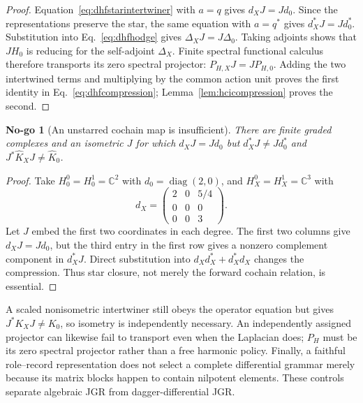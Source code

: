 \documentclass[11pt,a4paper]{article}
\newtheorem{nogo}[definition]{No-go}
\theoremstyle{remark}
\begin{document}
\begin{proof}
Equation~\eqref{eq:dhfstarintertwiner} with $a=q$ gives
$d_XJ=Jd_0$.  Since the representations preserve the star, the same equation
with $a=q^*$ gives $d_X^*J=Jd_0^*$.  Substitution into
Eq.~\eqref{eq:dhfhodge} gives $\Delta_XJ=J\Delta_0$.  Taking adjoints shows
that $JH_0$ is reducing for the self-adjoint $\Delta_X$.  Finite spectral
functional calculus therefore transports its zero spectral projector:
$P_{H,X}J=JP_{H,0}$.  Adding the two intertwined terms and multiplying by the
common action unit proves the first identity in
Eq.~\eqref{eq:dhfcompression}; Lemma~\ref{lem:hcicompression} proves the
second.
\end{proof}

\begin{nogo}[An unstarred cochain map is insufficient]
There are finite graded complexes and an isometric $J$ for which
$d_XJ=Jd_0$ but $d_X^*J\ne Jd_0^*$ and
$J^*\widehat K_XJ\ne\widehat K_0$.
\label{nogo:unstarredchain}
\end{nogo}

\begin{proof}
Take $H_0^0=H_0^1=\mathbb C^2$ with
$d_0=\operatorname{diag}(2,0)$, and
$H_X^0=H_X^1=\mathbb C^3$ with
\begin{equation}
 d_X=
 \begin{pmatrix}
  2&0&5/4\\0&0&0\\0&0&3
 \end{pmatrix}.
 \label{eq:dhfcontrol}
\end{equation}
Let $J$ embed the first two coordinates in each degree.  The first two
columns give $d_XJ=Jd_0$, but the third entry in the first row gives a
nonzero complement component in $d_X^*J$.  Direct substitution into
$d_Xd_X^*+d_X^*d_X$ changes the compression.  Thus star closure, not merely
the forward cochain relation, is essential.
\end{proof}

A scaled nonisometric intertwiner still obeys the operator equation but gives
$J^*K_XJ\ne K_0$, so isometry is independently necessary.  An independently
assigned projector can likewise fail to transport even when the Laplacian
does; $P_H$ must be its zero spectral projector rather than a free harmonic
policy.  Finally, a faithful role--record representation does not select a
complete differential grammar merely because its matrix blocks happen to
contain nilpotent elements.  These controls separate algebraic JGR from
dagger-differential JGR.
\end{document}
